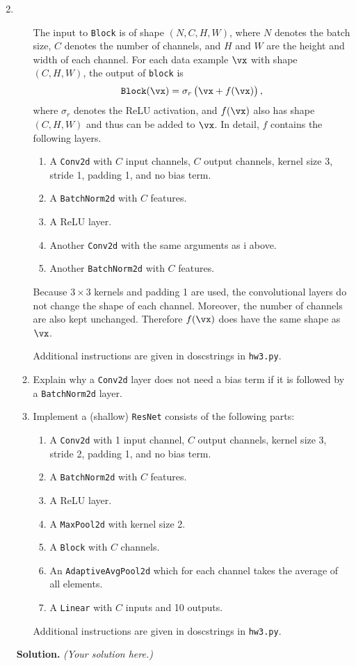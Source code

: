\documentclass{article}
\theoremstyle{definition}
\theoremstyle{remark}
\newenvironment{Q}
{%
\clearpage
\item
}
{%
\phantom{s}
\bigskip
\textbf{Solution.}
\emph{(Your solution here.)}
}
\begin{document}
\begin{enumerate}
\begin{Q}
\begin{enumerate}
        The input to \texttt{Block} is of shape $(N,C,H,W)$, where $N$ denotes the batch size, $C$ denotes the number of channels, and $H$ and $W$ are the height and width of each channel. For each data example $\vx$ with shape $(C,H,W)$, the output of \texttt{block} is
        \begin{align*}%
            \texttt{Block}(\vx)=\sigma_r\del{\vx+f(\vx)},
        \end{align*}
        where $\sigma_r$ denotes the ReLU activation, and $f(\vx)$ also has shape $(C,H,W)$ and thus can be added to $\vx$. In detail, $f$ contains the following layers.
        \begin{enumerate}
            \item A \texttt{Conv2d} with $C$ input channels, $C$ output channels, kernel size 3, stride 1, padding 1, and no bias term.
            \item A \texttt{BatchNorm2d} with $C$ features.
            \item A ReLU layer.
            \item Another \texttt{Conv2d} with the same arguments as i above.
            \item Another \texttt{BatchNorm2d} with $C$ features.
        \end{enumerate}
        Because $3\times3$ kernels and padding 1 are used, the convolutional layers do not change the shape of each channel. Moreover, the number of channels are also kept unchanged. Therefore $f(\vx)$ does have the same shape as $\vx$.

        Additional instructions are given in doscstrings in \texttt{hw3.py}.

        \item Explain why a \texttt{Conv2d} layer does not need a bias term if it is followed by a \texttt{BatchNorm2d} layer.

        \item Implement a (shallow) \texttt{ResNet} consists of the following parts:
        \begin{enumerate}
            \item A \texttt{Conv2d} with 1 input channel, $C$ output channels, kernel size 3, stride 2, padding 1, and no bias term.
            \item A \texttt{BatchNorm2d} with $C$ features.
            \item A ReLU layer.
            \item A \texttt{MaxPool2d} with kernel size 2.
            \item A \texttt{Block} with $C$ channels.
            \item An \texttt{AdaptiveAvgPool2d} which for each channel takes the average of all elements.
            \item A \texttt{Linear} with $C$ inputs and 10 outputs.
        \end{enumerate}
        Additional instructions are given in doscstrings in \texttt{hw3.py}.


\end{enumerate}
\end{Q}
\end{enumerate}
\end{document}
